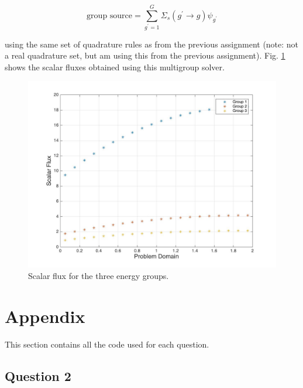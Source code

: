 \documentclass[10pt]{article}
\begin{document}
\begin{equation}
\text{group source}=\sum_{g^{'}=1}^G\Sigma_s(g^{'}\rightarrow g)\psi_{g^{'}}
\end{equation}

using the same set of quadrature rules as from the previous assignment (note: not a real quadrature set, but am using this from the previous assignment). Fig. \ref{fig:1} shows the scalar fluxes obtained using this multigroup solver. 

\begin{figure}[H]
  \centering
  \includegraphics[width=12cm]{ScalarFlux_3Group.jpg} %
  \caption{Scalar flux for the three energy groups.}
  \label{fig:1}
\end{figure}

\section{Appendix}
This section contains all the code used for each question. 

\subsection{Question 2}

\end{document}
